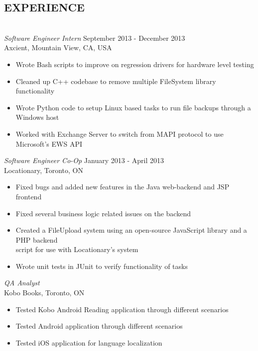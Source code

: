 \documentclass[a4paper, letterpaper]{res}
\newcommand{\tab}[1]{\hspace{.2\textwidth}\rlap{#1}}
\begin{document}
\begin{resume}
\section{EXPERIENCE} 
				~\\[-2mm]
				{\sl Software Engineer Intern} \hspace*{2.6in}September 2013 - December 2013  \\
				Axcient, Mountain View, CA, USA
                 \begin{itemize}  \itemsep -2pt %
                 \item Wrote Bash scripts to improve on regression drivers for hardware level testing
                 \item Cleaned up C++ codebase to remove multiple FileSystem library functionality 
                 \item Wrote Python code to setup Linux based tasks to run file backups through a Windows host
                 \item Worked with Exchange Server to switch from MAPI protocol to use Microsoft's EWS API
                 \end{itemize} 
				{\sl Software Engineer Co-Op} \hspace*{3in}January 2013 - April 2013 \\
				Locationary, Toronto, ON 
                 \begin{itemize}  \itemsep -2pt %
                 \item Fixed bugs and added new features in the Java web-backend and JSP frontend
                 \item Fixed several business logic related issues on the backend
                \item Created a FileUpload system using an open-source JavaScript library and a PHP backend\\ script for use with Locationary's system
                \item Wrote unit tests in JUnit to verify functionality of tasks
                \end{itemize}
                {\sl QA Analyst}             \tab{\tab{\tab{May 2012 - August 2012}}} \\
		          Kobo Books, Toronto, ON
                   \begin{itemize}  \itemsep -2pt %
                  \item Tested Kobo Android Reading application through different scenarios
                  \item Tested Android application through different scenarios
                   \item Tested iOS application for language localization
                   \end{itemize} 
 

\end{resume}
\end{document}
